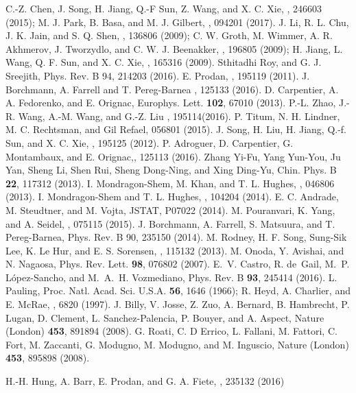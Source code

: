 \documentclass[aps,prb,showpacs,twocolumn,floats]{revtex4-1}
\begin{document}
\begin{thebibliography}{99}
C.-Z. Chen, J. Song, H. Jiang, Q.-F Sun, Z. Wang, and X. C. Xie, , 246603 (2015);  M. J. Park, B. Basa, and M. J. Gilbert, , 094201 (2017).
 J. Li, R. L. Chu, J. K. Jain, and S. Q. Shen, , 136806 (2009); 
 C. W. Groth, M. Wimmer, A. R. Akhmerov, J. Tworzydlo, and C. W. J. Beenakker, , 196805 (2009);
 H. Jiang, L. Wang, Q. F. Sun, and X. C. Xie, , 165316 (2009). 
 Sthitadhi Roy, and G. J. Sreejith, Phys. Rev. B 94, 214203 (2016).
E. Prodan, , 195119 (2011).
 J. Borchmann, A. Farrell and T.  Pereg-Barnea , 125133 (2016).
 D. Carpentier, A. A. Fedorenko, and E. Orignac, Europhys. Lett. {\bf 102}, 67010 (2013).
 P.-L. Zhao, J.-R. Wang, A.-M. Wang, and G.-Z. Liu , 195114(2016).
 P. Titum, N. H. Lindner, M. C. Rechtsman, and Gil Refael,  056801 (2015).
J. Song, H. Liu, H. Jiang, Q.-f. Sun, and X. C. Xie, , 195125 (2012).
 P. Adroguer, D. Carpentier, G. Montambaux, and E. Orignac,, 125113 (2016).
 Zhang Yi-Fu, Yang Yun-You, Ju Yan, Sheng Li, Shen Rui,
Sheng Dong-Ning, and Xing Ding-Yu, Chin. Phys. B {\bf 22}, 117312 (2013). 
I. Mondragon-Shem, M. Khan, and T. L. Hughes,  , 046806 (2013).
 I. Mondragon-Shem and T. L. Hughes, , 104204 (2014).
  E. C. Andrade, M. Steudtner, and M. Vojta, JSTAT, P07022 (2014).
M. Pouranvari, K. Yang, and A. Seidel, , 075115 (2015).
 J. Borchmann, A. Farrell, S. Matsuura, and T. Pereg-Barnea, Phys. Rev. B 90, 235150 (2014).
 M. Rodney, H. F. Song, Sung-Sik Lee,  K. Le Hur, and E. S. Sorensen, , 115132 (2013).
 M. Onoda, Y. Avishai, and N. Nagaosa, Phys. Rev. Lett. \textbf{98},
  076802 (2007).
 E.~V. Castro, R. de~Gail, M.~P. L\'opez-Sancho, and M.~A.~H. Vozmediano, Phys. Rev. B
  \textbf{93}, 245414 (2016).
L. Pauling, Proc. Natl. Acad. Sci. U.S.A. {\bf 56}, 1646 (1966); 
R. Heyd, A. Charlier, and E. McRae, , 6820 (1997).
 J. Billy, V. Josse, Z. Zuo, A. Bernard, B. Hambrecht, P. Lugan, D. Clement, L. Sanchez-Palencia, P. Bouyer, and  A.  Aspect,  Nature (London) {\bf 453}, 891894 (2008).
 G. Roati,  C. D Errico,  L. Fallani, M. Fattori, C. Fort,  M. Zaccanti, G. Modugno, M.  Modugno,  and M.  Inguscio,  Nature (London) {\bf 453}, 895898 (2008).

   H.-H. Hung, A. Barr, E. Prodan, and G. A. Fiete, , 235132 (2016)
\end{thebibliography}




\end{document}
